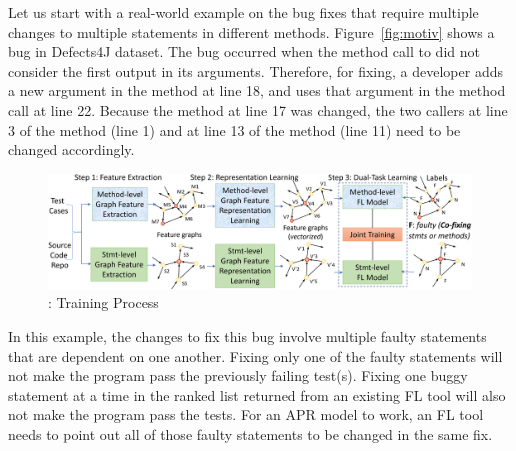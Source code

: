 Let us start with a real-world example on the bug fixes that
require multiple changes to multiple statements in different methods.
Figure~\ref{fig:motiv} shows a bug in Defects4J dataset. The bug
occurred when the method call to  did not
consider the first output in its arguments. Therefore, for fixing, a
developer adds a new argument in the method  at line
18, and uses that argument in the method call  at line 22. Because the method  at
line 17 was changed, the two callers at line 3 of the method
 (line 1) and at line 13 of the method 
(line 11) need to be changed accordingly.




\begin{figure}[t]
	\centering
	\includegraphics[width=5.65in]{graphs/overview-training-4.png} %
        \vspace{-8pt}
	\caption{{\tool}: Training Process}
        \label{train-overview}
\end{figure}

 In this
example, the changes to fix this bug involve multiple faulty
statements that are dependent on one another. Fixing only one of the
faulty statements will not make the program pass the previously
failing test(s). Fixing one buggy statement at a time in the ranked
list returned from an existing FL tool will also not make the program
pass the tests. For an APR model to work, an FL tool needs to point
out all of those faulty statements to be changed in the same fix.


